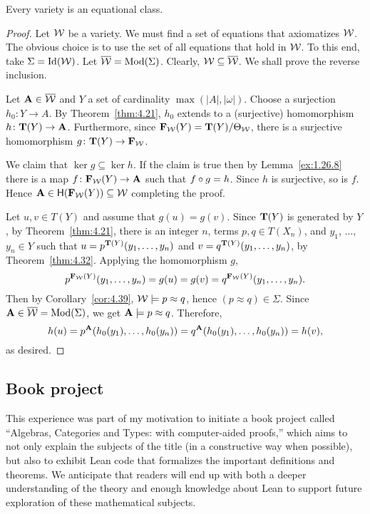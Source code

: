 \documentclass[12pt]{amsart}  %
\begin{document}
\begin{theorem}
  \label{thm:4.41}
Every variety is an equational class.
\end{theorem}
\begin{proof}
Let $\mathcal{W}$ be a variety. We must find a set of equations that axiomatizes $\mathcal{W}$. 
The obvious choice is to use the set of all equations that hold in $\mathcal{W}$. 
To this end, take $\Sigma = \operatorname{Id}(\mathcal{W})$. Let $\overline{\mathcal{W}} = \operatorname{Mod}(\Sigma)$. 
Clearly, $\mathcal{W} \subseteq \overline{\mathcal{W}}$. We shall prove the reverse inclusion.

Let $\mathbf{A} \in \overline{\mathcal{W}}$ and $Y$ a set of cardinality $\max(|A|, |\omega|)$. 
Choose a surjection $h_0\colon Y \to A$. By Theorem~\ref{thm:4.21}, $h_0$ extends to 
a (surjective) homomorphism $h \colon \mathbf{T}(Y) \to \mathbf{A}$. Furthermore, since 
$\mathbf{F}_{\mathcal{W}}(Y) = \mathbf{T}(Y)/\Theta_{\mathcal{W}}$, there is a surjective homomorphism
$g \colon \mathbf{T}(Y) \to \mathbf{F}_{\mathcal{W}}$.

We claim that $\ker g \subseteq \ker h$. 
If the claim is true then by Lemma~\ref{ex:1.26.8} there is a map 
$f\colon \mathbf{F}_{\mathcal{W}}(Y) \to \mathbf{A}$ such that $f \circ g = h$. 
Since $h$ is surjective, so is $f$. Hence 
$\mathbf{A} \in \mathsf{H}(\mathbf{F}_{\mathcal{W}}(Y)) \subseteq \mathcal{W}$ completing the proof.

Let $u,v \in T(Y)$ and assume that $g(u) = g(v)$. 
Since $\mathbf{T}(Y)$ is generated by $Y$, by Theorem~\ref{thm:4.21}, 
there is an integer $n$, terms $p, q \in T(X_n)$, and 
$y_1$, $\dots$, $y_n \in Y$ such that $u = p^{\mathbf{T}(Y)}(y_1,\dots, y_n)$ and 
$v = q^{\mathbf{T}(Y)}(y_1,\dots, y_n)$, by Theorem~\ref{thm:4.32}. 
Applying the homomorphism $g$,
\[
 p^{\mathbf{F}_{\mathcal{W}}(Y)}(y_1,\dots, y_n) = g(u) = g(v) = 
 q^{\mathbf{F}_{\mathcal{W}}(Y)}(y_1,\dots, y_n).
 \]
 Then by Corollary~\ref{cor:4.39}, $\mathcal{W} \models p \approx q$, hence 
 $(p \approx q) \in \Sigma$. 
 Since $\mathbf{A} \in \overline{\mathcal{W}} = \operatorname{Mod}(\Sigma)$,
 we get $\mathbf{A} \models p \approx q$. Therefore, 
 \[
  h(u) = p^{\mathbf{A}}(h_0(y_1), \dots, h_0(y_n))
  = q^{\mathbf{A}}(h_0(y_1), \dots, h_0(y_n)) = h(v),
  \]
 as desired.
\end{proof}

\subsection{Book project}  This experience was part of my motivation to 
initiate a book project called ``Algebras, Categories and Types: with computer-aided proofs,'' 
which aims to not only explain the subjects of the title (in a constructive way when possible),
but also to exhibit Lean code that formalizes the important definitions and theorems.
We anticipate that readers will end up with both a deeper understanding of
the theory and enough knowledge about Lean to support future exploration of these
mathematical subjects.
\end{document}
